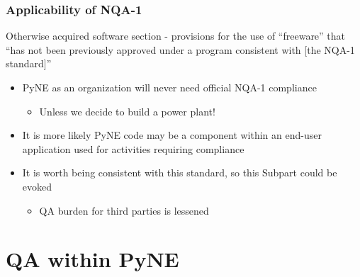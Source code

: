 \documentclass[12pt]{beamer}
\begin{document}
\begin{frame}
\frametitle{Applicability of NQA-1}

\alert{Otherwise acquired software} section - provisions for the use of
``freeware'' that ``has not been previously approved under a program consistent
with [the NQA-1 standard]''

\begin{itemize}
\item{PyNE as an organization will never need official NQA-1 compliance}
    \begin{itemize}
    \item{Unless we decide to build a power plant!}
    \end{itemize}
\item{It is more likely PyNE code may be a component within an end-user application used for activities requiring compliance}
\item{It is worth being consistent with this standard, so this Subpart could be evoked}
    \begin{itemize}
    \item{QA burden for third parties is lessened}
    \end{itemize}
\end{itemize}

\end{frame}

\section{QA within PyNE}
%
%
%
%
\end{document}
